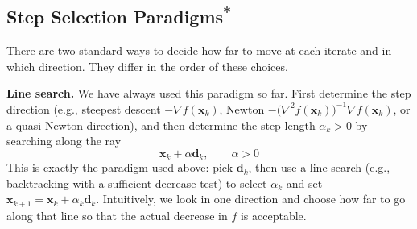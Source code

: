 \subsection{\texorpdfstring{Step Selection Paradigms\textsuperscript{*}}{Step Selection Paradigms}}
\label{sec:step-selection}
There are two standard ways to decide how far to move at each iterate and in which direction. They differ in the order of these choices.

\textbf{Line search.} We have always used this paradigm so far. First determine the step direction (e.g., steepest descent $-\nabla f(\mathbf{x}_k)$, Newton $-\big(\nabla^2 f(\mathbf{x}_k)\big)^{-1}\nabla f(\mathbf{x}_k)$, or a quasi-Newton direction), and then determine the step length $\alpha_k>0$ by searching along the ray
\begin{equation}
    \mathbf{x}_k+\alpha\mathbf{d}_k,\qquad \alpha>0
\end{equation}
This is exactly the paradigm used above: pick $\mathbf{d}_k$, then use a line search (e.g., backtracking with a sufficient-decrease test) to select $\alpha_k$ and set $\mathbf{x}_{k+1}=\mathbf{x}_k+\alpha_k\mathbf{d}_k$. Intuitively, we look in one direction and choose how far to go along that line so that the actual decrease in $f$ is acceptable.

